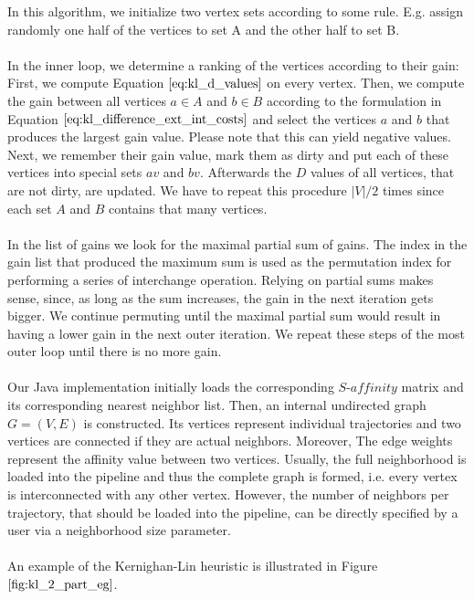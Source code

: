 In this algorithm, we initialize two vertex sets according to some rule. E.g. assign randomly one half of the vertices to set A and the other half to set B. \\ \\
In the inner loop, we determine a ranking of the vertices according to their gain: First, we compute Equation $\ref{eq:kl_d_values}$ on every vertex. Then, we compute the gain between all vertices $a \in A$ and $b \in B$ according to the formulation in Equation $\ref{eq:kl_difference_ext_int_costs}$ and select the vertices $a$ and $b$ that produces the largest gain value. Please note that this can yield negative values. Next, we remember their gain value, mark them as dirty and put each of these vertices into special sets $av$ and $bv$. Afterwards the $D$ values of all vertices, that are not dirty, are updated. We have to repeat this procedure $|V|/2$ times since each set $A$ and $B$ contains that many vertices. \\ \\
In the list of gains we look for the maximal partial sum of gains. The index in the gain list that produced the maximum sum is used as the permutation index for performing a series of interchange operation. Relying on partial sums makes sense, since, as long as the sum increases, the gain in the next iteration gets bigger. We continue permuting until the maximal partial sum would result in having a lower gain in the next outer iteration. We repeat these steps of the most outer loop until there is no more gain. \\ \\
Our Java implementation initially loads the corresponding $\textit{S-affinity}$ matrix and its corresponding nearest neighbor list. Then, an internal undirected graph $G = \left( V, E \right)$ is constructed. Its vertices represent individual trajectories and two vertices are connected if they are actual neighbors. Moreover, The edge weights represent the affinity value between two vertices. Usually, the full neighborhood is loaded into the pipeline and thus the complete graph is formed, i.e. every vertex is interconnected with any other vertex. However, the number of neighbors per trajectory, that should be loaded into the pipeline, can be directly specified by a user via a neighborhood size parameter. \\ \\
An example of the Kernighan-Lin heuristic is illustrated in Figure $\ref{fig:kl_2_part_eg}$.

